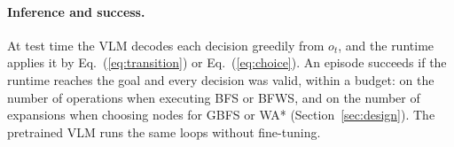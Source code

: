 \paragraph{Inference and success.} At test time the VLM decodes each decision greedily from $o_t$, and the runtime applies it by Eq.~(\ref{eq:transition}) or Eq.~(\ref{eq:choice}). An episode succeeds if the runtime reaches the goal and every decision was valid, within a budget: on the number of operations when executing BFS or BFWS, and on the number of expansions when choosing nodes for GBFS or WA* (Section~\ref{sec:design}). The pretrained VLM runs the same loops without fine-tuning.

